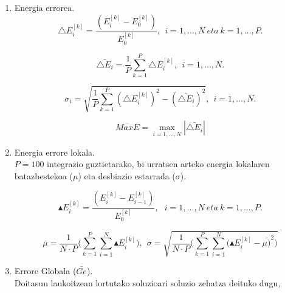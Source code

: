 \begin{enumerate}

           \item Energia errorea.\\
           \begin{equation*}
           \triangle E_i^{[k]}=\frac{(E^{[k]}_i-E^{[k]}_0)}{E^{[k]}_0}, \ \ i=1,\dots,N \ eta \ k=1,\dots,P.
           \end{equation*}  
           
           \begin{equation*}
           \bar{\triangle E_i}=\frac{1}{P} \sum_{k=1}^{P} \triangle E_i^{[k]}, \ \ i=1,\dots,N.
           \end{equation*}
           
           \begin{equation*}
           \sigma_i=\sqrt{\frac{1}{P} \sum_{k=1}^{P} (\triangle E_i^{[k]})^2-(\bar{\triangle E_i})^2}, \ \ i=1,\dots,N.
           \end{equation*}
           
           \begin{equation*}
           \bar{MaxE}=\max_{i=1,\dots,N} |\bar{\triangle E_i}|
           \end{equation*}

           \item Energia errore lokala.\\ 
            $P=100$ integrazio guztietarako, bi urratsen arteko energia lokalaren batazbestekoa ($\mu$) eta desbiazio estarrada ($\sigma$). 
            
           \begin{equation*}
             \blacktriangle E_i^{[k]}=\frac{(E^{[k]}_i-E^{[k]}_{i-1})}{E^{[k]}_0},\ \ \ i=1,\dots,N \ eta \ k=1,\dots,P.          
           \end{equation*}
           
           \begin{equation*}
            \bar{\mu}= \frac{1}{N\cdot P} \bigg(\sum_{k=1}^{P} \sum_{i=1}^{N} {\blacktriangle E_i^{[k]}\bigg)}, \ \
            \bar{\sigma} = \sqrt{\frac{1}{N\cdot P} \bigg(\sum_{k=1}^{P} \sum_{i=1}^{N} {(\blacktriangle E_i^{[k]}-\bar{\mu)}^2}\bigg)}
           \end{equation*}
           
           \item Errore Globala ($\bar{Ge}$).\\
            Doitasun laukoitzean lortutako soluzioari soluzio zehatza deituko dugu,
            

\end{enumerate}
